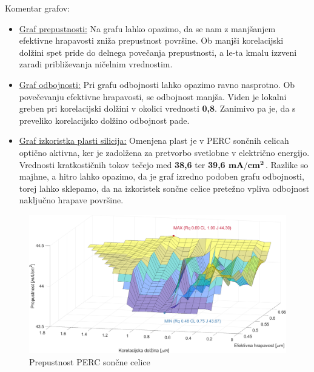 \documentclass[a4paper,twoside,openright,12pt,slovene]{book}
\begin{document}
Komentar grafov:
\begin{itemize}
    \item \underline{\hyperref[fig:pre_PERC]{Graf prepustnosti:}} Na grafu lahko opazimo, da se nam z manjšanjem efektivne hrapavosti zniža prepustnost površine. Ob manjši korelacijski dolžini spet pride do delnega povečanja prepustnosti, a le-ta kmalu izzveni zaradi približevanja ničelnim vrednostim.
    
    \item \underline{\hyperref[fig:odb_PERC]{Graf odbojnosti:}} Pri grafu odbojnosti lahko opazimo ravno nasprotno. Ob povečevanju efektivne hrapavosti, se odbojnost manjša. Viden je lokalni greben pri korelacijski dolžini v okolici vrednosti \textbf{0,8}. Zanimivo pa je, da s preveliko korelacijsko dolžino odbojnost pade.
    
    \item \underline{\hyperref[fig:cSi]{Graf izkoristka plasti silicija:}} Omenjena plast je v PERC sončnih celicah optično aktivna, ker je zadolžena za pretvorbo svetlobne v električno energijo. Vrednosti kratkostičnih tokov tečejo med \textbf{38,6} ter \textbf{39,6} $\bf mA/cm^2$. Razlike so majhne, a hitro lahko opazimo, da je graf izredno podoben grafu odbojnosti, torej lahko sklepamo, da na izkoristek sončne celice pretežno vpliva odbojnost naključno hrapave površine.
\end{itemize}

\begin{figure}[H]
    \centering
    \includegraphics[width=150mm]{Slike/pre_PERC.png}
    \caption{Prepustnost PERC sončne celice}
    \label{fig:pre_PERC}
\end{figure}
\end{document}
